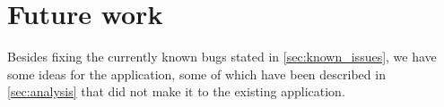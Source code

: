 \section{Future work}
\label{sec:future_work}
Besides fixing the currently known bugs stated in \ref{sec:known_issues}, we have some ideas for the application, some of which have been described in \ref{sec:analysis} that did not make it to the existing application.

